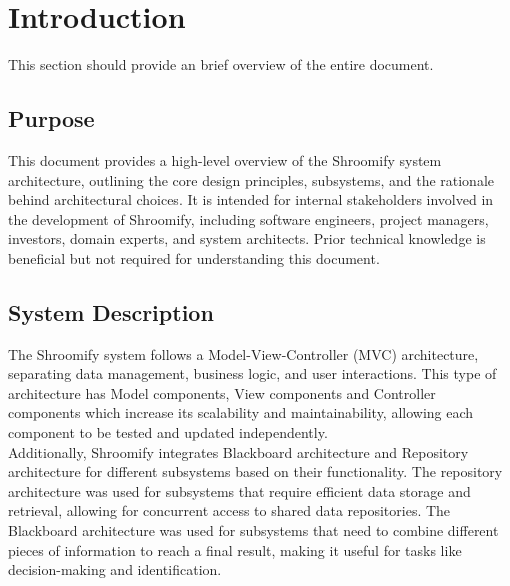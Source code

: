 \documentclass[]{article}
\begin{document}
\newpage
\section{Introduction}
\label{sec:introduction}

This section should provide an brief overview of the entire document.

\subsection{Purpose}
\label{sub:purpose}
This document provides a high-level overview of the Shroomify system architecture, outlining the core design principles, subsystems, and the rationale behind architectural choices. It is intended for internal stakeholders involved in the development of Shroomify, including software engineers, project managers, investors, domain experts, and system architects. Prior technical knowledge is beneficial but not required for understanding this document. 

\subsection{System Description}
\label{sub:system_description}
The Shroomify system follows a Model-View-Controller (MVC) architecture, separating data management, business logic, and user interactions. This type of architecture has Model components, View components and Controller components which increase its scalability and  maintainability, allowing each component to be tested and updated independently.\\

\noindent Additionally, Shroomify integrates Blackboard architecture and Repository architecture for  different subsystems based on their functionality. The repository architecture was used for subsystems that require efficient data storage and retrieval, allowing for concurrent access to shared data repositories. The Blackboard architecture was used for subsystems that need to combine different pieces of information to reach a final result, making it useful for tasks like decision-making and identification.

\end{document}

